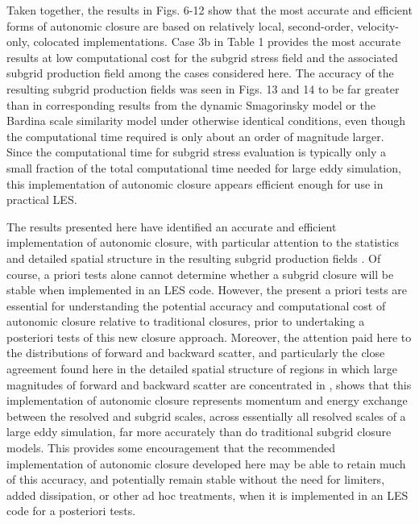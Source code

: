 Taken together, the results in Figs. 6-12 show that the most accurate and efficient forms of autonomic closure are based on relatively local, second-order, velocity-only, colocated implementations. Case 3b in Table 1 provides the most accurate results at low computational cost for the subgrid stress field   and the associated subgrid production field   among the cases considered here. The accuracy of the resulting subgrid production fields   was seen in Figs. 13 and 14 to be far greater than in corresponding results from the dynamic Smagorinsky model or the Bardina scale similarity model under otherwise identical conditions, even though the computational time required is only about an order of magnitude larger. Since the computational time for subgrid stress evaluation is typically only a small fraction of the total computational time needed for large eddy simulation, this implementation of autonomic closure appears efficient enough for use in practical LES.

The results presented here have identified an accurate and efficient implementation of autonomic closure, with particular attention to the statistics and detailed spatial structure in the resulting subgrid production fields  . Of course, a priori tests alone cannot determine whether a subgrid closure will be stable when implemented in an LES code. However, the present a priori tests are essential for understanding the potential accuracy and computational cost of autonomic closure relative to traditional closures, prior to undertaking a posteriori tests of this new closure approach. Moreover, the attention paid here to the distributions of forward and backward scatter, and particularly the close agreement found here in the detailed spatial structure of regions in which large magnitudes of forward and backward scatter are concentrated in  , shows that this implementation of autonomic closure represents momentum and energy exchange between the resolved and subgrid scales, across essentially all resolved scales of a large eddy simulation, far more accurately than do traditional subgrid closure models. This provides some encouragement that the recommended implementation of autonomic closure developed here may be able to retain much of this accuracy, and potentially remain stable without the need for limiters, added dissipation, or other ad hoc treatments, when it is implemented in an LES code for a posteriori tests.

